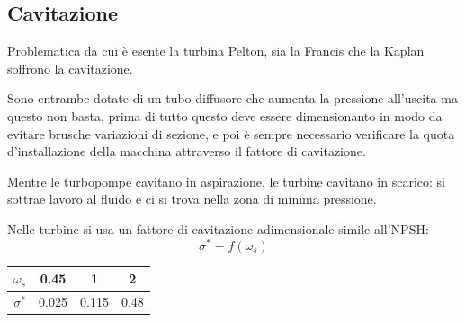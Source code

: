 \documentclass[a4paper, 15pt]{article}
\begin{document}
\subsection{Cavitazione}
\begin{adjustwidth}{2in}{}
	Problematica da cui è esente la turbina Pelton, sia la Francis che la Kaplan soffrono la cavitazione. 
	
	Sono entrambe dotate di un tubo diffusore che aumenta la pressione all'uscita ma questo non basta, prima di tutto questo deve essere dimensionanto in modo da evitare brusche variazioni di sezione, e poi è sempre necessario verificare la quota d'installazione della macchina attraverso il fattore di cavitazione. \newline 
	
	Mentre le turbopompe cavitano in aspirazione, le turbine cavitano in scarico: si sottrae lavoro al fluido e ci si trova nella zona di minima pressione. 
	
	Nelle turbine si usa un fattore di cavitazione adimensionale simile all'NPSH:
	\[\sigma^* = f(\omega_s)\]
	
	\begin{center}		
	\begin{tabular}{|c|c|c|c|}
		\hline
		 $\omega_s$  & 0.45  &   1   &  2   \\ \hline
		 $\sigma^*$ & 0.025 & 0.115 & 0.48 \\ \hline
	\end{tabular}
	\end{center}


\end{adjustwidth}
\end{document}
